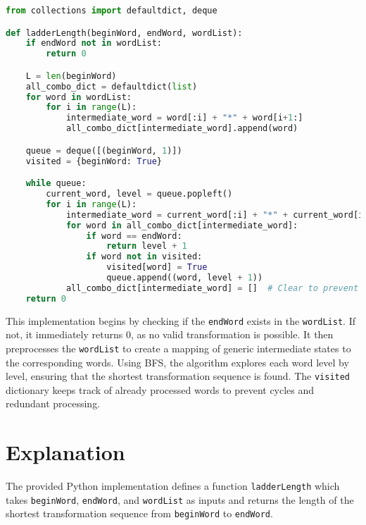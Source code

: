 \begin{fullwidth}
\begin{lstlisting}[language=Python]
from collections import defaultdict, deque

def ladderLength(beginWord, endWord, wordList):
    if endWord not in wordList:
        return 0

    L = len(beginWord)
    all_combo_dict = defaultdict(list)
    for word in wordList:
        for i in range(L):
            intermediate_word = word[:i] + "*" + word[i+1:]
            all_combo_dict[intermediate_word].append(word)

    queue = deque([(beginWord, 1)])
    visited = {beginWord: True}

    while queue:
        current_word, level = queue.popleft()
        for i in range(L):
            intermediate_word = current_word[:i] + "*" + current_word[i+1:]
            for word in all_combo_dict[intermediate_word]:
                if word == endWord:
                    return level + 1
                if word not in visited:
                    visited[word] = True
                    queue.append((word, level + 1))
            all_combo_dict[intermediate_word] = []  # Clear to prevent re-processing
    return 0
\end{lstlisting}
\end{fullwidth}

This implementation begins by checking if the \texttt{endWord} exists in the \texttt{wordList}. If not, it immediately returns \(0\), as no valid transformation is possible. It then preprocesses the \texttt{wordList} to create a mapping of generic intermediate states to the corresponding words. Using BFS, the algorithm explores each word level by level, ensuring that the shortest transformation sequence is found. The \texttt{visited} dictionary keeps track of already processed words to prevent cycles and redundant processing.

\section*{Explanation}

The provided Python implementation defines a function \texttt{ladderLength} which takes \texttt{beginWord}, \texttt{endWord}, and \texttt{wordList} as inputs and returns the length of the shortest transformation sequence from \texttt{beginWord} to \texttt{endWord}.

